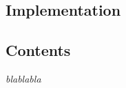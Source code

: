   \begin{titlepage}
    \vspace*{\fill}
      \part{Implementation}
    \vspace*{\fill}
  \end{titlepage}

\startcontents[parts]

\chapter*{Contents}

\textit{blablabla} 

\vspace{\baselineskip}


\pagebreak

\newpage

\newpage

\newpage


\stopcontents[parts]
